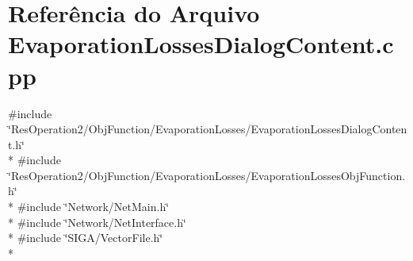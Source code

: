 \section{Referência do Arquivo Evaporation\+Losses\+Dialog\+Content.\+cpp}
\label{_2_obj_function_2_evaporation_losses_2_evaporation_losses_dialog_content_8cpp}
{\ttfamily \#include \char`\"{}Res\+Operation2/\+Obj\+Function/\+Evaporation\+Losses/\+Evaporation\+Losses\+Dialog\+Content.\+h\char`\"{}}\\*
{\ttfamily \#include \char`\"{}Res\+Operation2/\+Obj\+Function/\+Evaporation\+Losses/\+Evaporation\+Losses\+Obj\+Function.\+h\char`\"{}}\\*
{\ttfamily \#include \char`\"{}Network/\+Net\+Main.\+h\char`\"{}}\\*
{\ttfamily \#include \char`\"{}Network/\+Net\+Interface.\+h\char`\"{}}\\*
{\ttfamily \#include \char`\"{}S\+I\+G\+A/\+Vector\+File.\+h\char`\"{}}\\*
